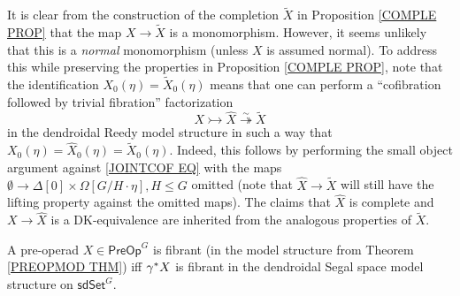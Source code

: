 \documentclass[a4paper,10pt
 ,draft
]{article}%
\begin{document}
\begin{remark}\label{COMPLENOR REM}
It is clear from the construction of the completion $\tilde{X}$
in Proposition \ref{COMPLE PROP}
that the map $X \to \tilde{X}$
is a monomorphism. 
However, it seems unlikely that this is a 
\emph{normal} monomorphism (unless $X$ is assumed normal).
To address this while preserving the properties in Proposition \ref{COMPLE PROP}, 
note that the identification 
$X_0(\eta) = \tilde{X}_0(\eta)$
means that one can perform a
``cofibration followed by trivial fibration'' factorization
\[
X \rightarrowtail \hat{X} \overset{\sim}{\twoheadrightarrow}  \tilde{X}
\]
in the dendroidal Reedy model structure in such a way that 
$X_0(\eta) = \hat{X}_0(\eta) = \tilde{X}_0(\eta)$. Indeed, this follows by performing the small object argument against \eqref{JOINTCOF EQ} with the maps $\emptyset \to \Delta[0] \times \Omega[G/H \cdot \eta], H\leq G$ omitted (note that $\hat{X} \to \tilde{X}$ will still have the lifting property against the omitted maps).
The claims that $\hat{X}$ is complete and $X \to \hat{X}$ is a DK-equivalence are inherited from the analogous properties of $\tilde{X}$.
\end{remark}


\begin{corollary}\label{FIB_PREOP_COR}
	A pre-operad $X \in \mathsf{PreOp}^G$ is 
	fibrant (in the model structure from Theorem \ref{PREOPMOD THM})
	iff $\gamma^{\**}X$ is fibrant in the dendroidal Segal space model structure on 
	$\mathsf{sdSet}^G$.
\end{corollary}
\end{document}
